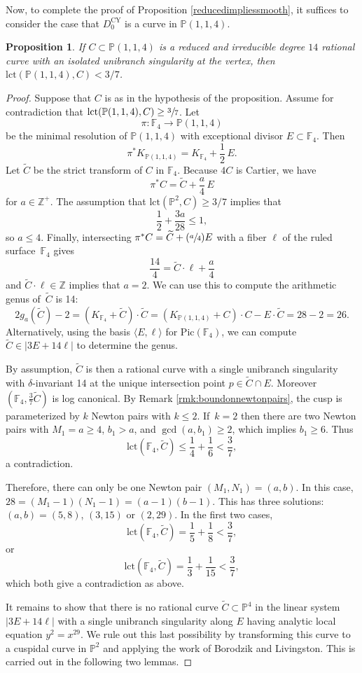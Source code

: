 \documentclass[JEP,XML,SOM,Unicode,NoFloatCountersInSection,published]{cedram}
\newcommand{\Psfrac}[2]{(\sfrac{#1}{#2})}
\theoremstyle{plain}
\newtheorem{proposition}[theorem]{Proposition}
\theoremstyle{definition}
\newcommand\FF{{\mathbb F}}
\newcommand\PP{{\mathbb{P}}}
\newcommand\ZZ{{\mathbb Z}}
\newcommand\lct{\mathrm{lct}}
\newcommand\Pic{{\mathrm{Pic}}}
\newcommand\Dcyo{{D^{\mathrm{CY}}_0}}
\newcommand\Ct{{\widetilde{C}}}
\newcommand\cl{{\colon}}
\begin{document}
Now, to complete the proof of Proposition \ref{reducedimpliessmooth}, it suffices to consider the case that $\Dcyo$ is a curve in $\PP(1,1,4)$.

\begin{proposition}\label{oneredcomp114}
If $C\subset \PP(1,1,4)$ is a reduced and irreducible degree $14$ rational curve with an isolated unibranch singularity at the vertex, then $\lct(\PP(1,1,4),C) < 3/7$.
\end{proposition}

\begin{proof}
Suppose that $C$ is as in the hypothesis of the proposition. Assume for contradiction that $\lct(\PP(1,1,4),C) \ge \sfrac{3}{7}$. Let
\[
\pi\cl \FF_4\to \PP(1,1,4)
\]
be the minimal resolution of $\PP(1,1,4)$ with exceptional divisor $E\subset \FF_4$. Then
\[
\pi^*K_{\PP(1,1,4)} = K_{\FF_4}+\frac{1}{2}\,E.
\]
Let $\Ct$ be the strict transform of $C$ in $\FF_4$. Because $4C$ is Cartier, we have
\[
\pi^*C = \Ct + \frac{a}{4}\,E
\]
for $a \in \ZZ^+$. The assumption that $\lct(\PP^2,C)\ge 3/7$ implies that
\[ \frac{1}{2} + \frac{3a}{28} \le 1,\]
so $a \le 4$. Finally, intersecting $\pi^*C = \Ct + \Psfrac{a}{4}E$ with a fiber $\ell$ of the ruled surface~$\FF_4$ gives
\[ \frac{14}{4} = \Ct\cdot \ell + \frac{a}{4} \]
and $\Ct \cdot \ell \in \ZZ$ implies that $a = 2$. We can use this to compute the arithmetic genus of~$\Ct$ is 14:
\[
2g_a(\Ct) - 2 = (K_{\FF_4} + \Ct) \cdot \Ct = (K_{\PP(1,1,4)} + C)\cdot C - E \cdot \Ct = 28 - 2 = 26.
\]
Alternatively, using the basis $\langle E, \ell \rangle$ for $\Pic(\FF_4)$, we can compute $\Ct \in |3E + 14 \ell|$ to determine the genus.

By assumption, $\Ct$ is then a rational curve with a single unibranch singularity with $\delta$-invariant 14 at the unique intersection point $p\in \Ct \cap E$. Moreover $(\FF_4,\frac{3}{7}\Ct)$ is log canonical. By Remark \ref{rmk:boundonnewtonpairs}, the cusp is parameterized by $k$ Newton pairs with $k \le 2$. If~$k=2$ then there are two Newton pairs with $M_1=a\ge 4$, $b_1>a$, and $\gcd(a,b_1)\ge 2$, which implies $b_1\ge 6$. Thus
\[
\lct(\FF_4,\Ct)\le\frac{1}{4}+\frac{1}{6} <\frac{3}{7},
\]
a contradiction.

Therefore, there can only be one Newton pair $(M_1,N_1) = (a,b)$. In this case, $28 = (M_1 -1)(N_1 -1) =(a-1)(b-1)$. This has three solutions: $(a,b) = (5,8)$, $ (3,15)$ or $(2,29)$. In the first two cases,
\[
\lct(\FF_4,\tilde{C}) = \frac{1}{5}+\frac{1}{8} < \frac{3}{7},
\]
or
\[
\lct(\FF_4,\Ct) = \frac{1}{3}+\frac{1}{15} < \frac{3}{7},
\]
which both give a contradiction as above.

It remains to show that there is no rational curve $\Ct\subset \PP^4$ in the linear system $|3E+14\ell|$ with a single unibranch singularity along $E$ having analytic local equation $y^2=x^{29}$. We rule out this last possibility by transforming this curve to a cuspidal curve in $\PP^2$ and applying the work of Borodzik and Livingston. This is carried out in the following two lemmas.
\end{proof}
\end{document}
